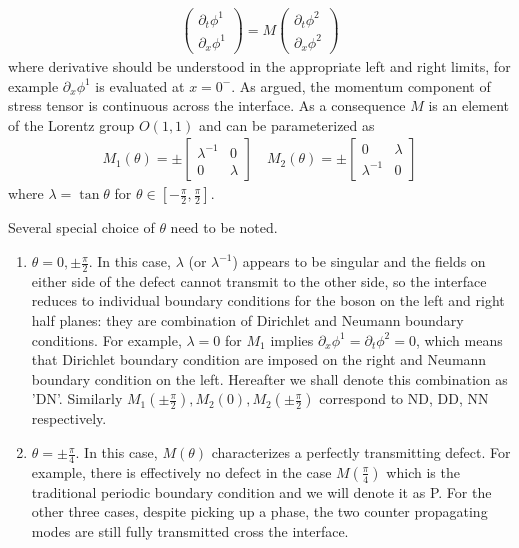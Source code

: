 \begin{equation}\begin{aligned}
\label{eq:def_M}
\begin{pmatrix}
\partial_t\phi^1\\
\partial_x\phi^1
\end{pmatrix}
=M\begin{pmatrix}
\partial_t\phi^2\\
\partial_x\phi^2
\end{pmatrix}
\end{aligned}\end{equation}
where derivative should be understood in the appropriate left and right limits, for example $\partial_x \phi^1$ is evaluated at $ x = 0^-$. As argued, the momentum component of stress tensor is continuous across the interface. As a consequence $M$ is an element of the Lorentz group $O(1,1)$ and can be parameterized as
\begin{equation}\begin{aligned}
M_1(\theta)=\pm
\begin{bmatrix}
\lambda^{-1} & 0 \\
0 & \lambda
\end{bmatrix}\quad
M_2(\theta)=\pm
\begin{bmatrix}
0 & \lambda  \\
\lambda^{-1} & 0 
\end{bmatrix}
\end{aligned}\end{equation}
where $\lambda=\tan\theta$ for $\theta\in\left[-\frac{\pi}{2},\frac{\pi}{2}\right]$. 

Several special choice of $\theta$ need to be noted. 
\begin{enumerate}
\item $\theta=0,\pm \frac{\pi}{2}$. In this case, $\lambda$ (or $\lambda^{-1}$) appears to be singular and the fields on either side of the defect cannot transmit to the other side, so the interface reduces to individual boundary conditions for the boson on the left and right half planes: they are combination of Dirichlet and Neumann boundary conditions. For example, $\lambda = 0$ for $M_1$ implies $\partial_x\phi^1 = \partial_t\phi^2 =0$, which means that Dirichlet boundary condition are imposed on the right and Neumann boundary condition on the left. Hereafter we shall denote this combination as 'DN'. Similarly $M_1(\pm\frac{\pi}{2}),M_2(0),M_2(\pm \frac{\pi}{2})$ correspond to ND, DD, NN respectively. 
\item $\theta = \pm \frac{\pi}{4}$. In this case, $M(\theta)$ characterizes a perfectly transmitting defect. For example, there is effectively no defect in the case $M( \frac{\pi}{4})$ which is the traditional periodic boundary condition and we will denote it as P. For the other three cases, despite picking up a phase, the two counter propagating modes are still fully transmitted cross the interface. 
\end{enumerate}

